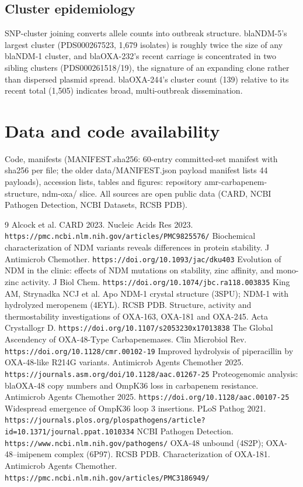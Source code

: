 \documentclass[11pt]{article}
\begin{document}
\subsection{Cluster epidemiology}
SNP-cluster joining converts allele counts into outbreak structure. blaNDM-5's largest cluster (PDS000267523, 1,679 isolates) is roughly twice the size of any blaNDM-1 cluster, and blaOXA-232's recent carriage is concentrated in two sibling clusters (PDS000261518/19), the signature of an expanding clone rather than dispersed plasmid spread. blaOXA-244's cluster count (139) relative to its recent total (1,505) indicates broad, multi-outbreak dissemination.
\section{Data and code availability}
Code, manifests (MANIFEST.sha256: 60-entry committed-set manifest with sha256 per file; the older data/MANIFEST.json payload manifest lists 44 payloads), accession lists, tables and figures: repository amr-carbapenem-structure, ndm-oxa/ slice. All sources are open public data (CARD, NCBI Pathogen Detection, NCBI Datasets, RCSB PDB).

\begin{thebibliography}{9}\small
{} Alcock et al. CARD 2023. Nucleic Acids Res 2023. {\tt https://pmc.ncbi.nlm.nih.gov/articles/PMC9825576/}
 Biochemical characterization of NDM variants reveals differences in protein stability. J Antimicrob Chemother. {\tt https://doi.org/10.1093/jac/dku403}
 Evolution of NDM in the clinic: effects of NDM mutations on stability, zinc affinity, and mono-zinc activity. J Biol Chem. {\tt https://doi.org/10.1074/jbc.ra118.003835}
 King AM, Strynadka NCJ et al. Apo NDM-1 crystal structure (3SPU); NDM-1 with hydrolyzed meropenem (4EYL). RCSB PDB.
 Structure, activity and thermostability investigations of OXA-163, OXA-181 and OXA-245. Acta Crystallogr D. {\tt https://doi.org/10.1107/s2053230x17013838}
 The Global Ascendency of OXA-48-Type Carbapenemases. Clin Microbiol Rev. {\tt https://doi.org/10.1128/cmr.00102-19}
 Improved hydrolysis of piperacillin by OXA-48-like R214G variants. Antimicrob Agents Chemother 2025. {\tt https://journals.asm.org/doi/10.1128/aac.01267-25}
 Proteogenomic analysis: blaOXA-48 copy numbers and OmpK36 loss in carbapenem resistance. Antimicrob Agents Chemother 2025. {\tt https://doi.org/10.1128/aac.00107-25}
 Widespread emergence of OmpK36 loop 3 insertions. PLoS Pathog 2021. {\tt https://journals.plos.org/plospathogens/article?id=10.1371/journal.ppat.1010334}
 NCBI Pathogen Detection. {\tt https://www.ncbi.nlm.nih.gov/pathogens/}
 OXA-48 unbound (4S2P); OXA-48--imipenem complex (6P97). RCSB PDB.
 Characterization of OXA-181. Antimicrob Agents Chemother. {\tt https://pmc.ncbi.nlm.nih.gov/articles/PMC3186949/}
\end{thebibliography}
\end{document}
